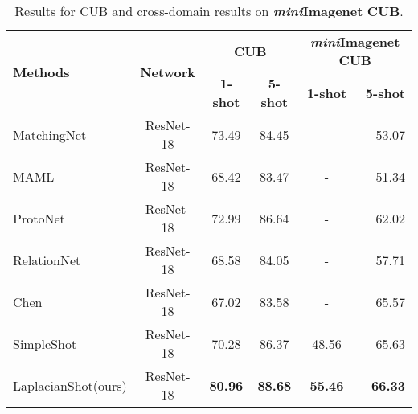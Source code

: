 \documentclass{article}
\begin{document}
\begin{table*}[t]
\caption{Results for CUB and cross-domain results on \textbf{\textit{mini}Imagenet}  \textbf{CUB}.}
\label{tab:cub}
\vskip 0.1in
\begin{center}
\begin{small}
\begin{tabular}{lccccr}
\toprule
    \multirow{2}{*}{\textbf{Methods}}& \multirow{2}{*}{\textbf{Network}}& \multicolumn{2}{c}{\textbf{CUB}} & \multicolumn{2}{c}{\textbf{\textit{mini}Imagenet}  \textbf{CUB}}\\
     & & \textbf{1-shot}& \textbf{5-shot} & \textbf{1-shot}&\textbf{5-shot}\\
     \toprule
     MatchingNet \cite{Vinyals2016MatchingNF}& ResNet-18 &  73.49 & 84.45 & - & 53.07\\
     MAML \cite{Finn2017ModelAgnosticMF} & ResNet-18 & 68.42 & 83.47  & - & 51.34 \\
     ProtoNet \cite{snell2017prototypical} & ResNet-18 & 72.99 & 86.64  & - & 62.02 \\
     RelationNet \cite{sung2018learning} & ResNet-18 & 68.58 & 84.05  & - & 57.71 \\
     Chen \cite{chen2018a} & ResNet-18 & 67.02 & 83.58  & - & 65.57 \\
     SimpleShot \cite{wang2019simpleshot} & ResNet-18 & 70.28 & 86.37 & 48.56 &65.63\\
     \midrule
     LaplacianShot(ours) & ResNet-18 & \textbf{80.96} & \textbf{88.68} &\textbf{55.46} &\textbf{66.33}\\
     \bottomrule
\end{tabular}
\end{small}
\end{center}
\vskip -0.1in
\end{table*}
\end{document}
